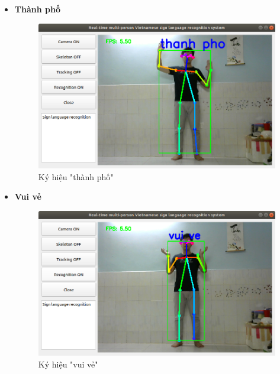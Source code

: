 \documentclass[12pt,a4paper,oneside]{book}
\numberwithin{equation}{chapter} %
\numberwithin{figure}{chapter} %
\numberwithin{table}{chapter} %
\begin{document}
\begin{itemize}
\item \textbf{Thành phố}
\FloatBarrier
\begin{figure}[htp]
\begin{center}
\includegraphics[scale=0.4]{kq/thanh_pho.png}
\end{center}
\caption{Ký hiệu "thành phố"}
\end{figure}
\FloatBarrier

\thispagestyle{phuluc}
\pagebreak

\item \textbf{Vui vẻ}
\FloatBarrier
\begin{figure}[htp]
\begin{center}
\includegraphics[scale=0.4]{kq/vui_ve.png}
\end{center}
\caption{Ký hiệu "vui vẻ"}
\end{figure}
\FloatBarrier


\end{itemize}
\end{document}
